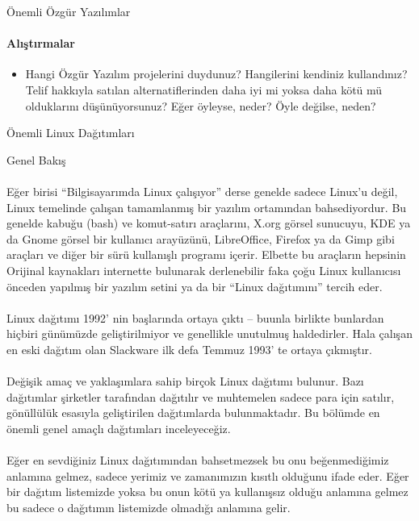 \documentclass[10pt,a5paper]{book}
\begin{document}
\begin{section}{Önemli Özgür Yazılımlar}
\paragraph{Alıştırmalar}
\begin{itemize}
 \item Hangi Özgür Yazılım projelerini duydunuz? Hangilerini kendiniz kullandınız? Telif hakkıyla satılan alternatiflerinden daha iyi mi yoksa daha kötü mü olduklarını düşünüyorsunuz? Eğer öyleyse, neder? Öyle değilse, neden?
\end{itemize}
\end{section}
\begin{section}{Önemli Linux Dağıtımları}
\begin{subsection}{Genel Bakış}
\paragraph{}{Eğer birisi “Bilgisayarımda Linux çalışıyor” derse genelde sadece Linux'u değil, Linux temelinde çalışan tamamlanmış bir yazılım ortamından bahsediyordur. Bu genelde kabuğu (bash) ve komut-satırı araçlarını, X.org görsel sunucuyu, KDE ya da Gnome görsel bir kullanıcı arayüzünü, LibreOffice, Firefox ya da Gimp gibi araçları ve diğer bir sürü kullanışlı programı içerir. Elbette bu araçların hepsinin Orijinal kaynakları internette bulunarak derlenebilir faka çoğu Linux kullanıcısı önceden yapılmış bir yazılım setini ya da bir “Linux dağıtımını” tercih eder.}
\paragraph{} {Linux dağıtımı 1992' nin başlarında ortaya çıktı -- buunla birlikte bunlardan hiçbiri günümüzde geliştirilmiyor ve genellikle unutulmuş haldedirler. Hala çalışan en eski dağıtım olan Slackware ilk defa Temmuz 1993' te ortaya çıkmıştır.}
\paragraph{}{Değişik amaç ve yaklaşımlara sahip birçok Linux dağıtımı bulunur. Bazı dağıtımlar şirketler tarafından dağıtılır ve muhtemelen sadece para için satılır, gönüllülük esasıyla geliştirilen dağıtımlarda bulunmaktadır. Bu bölümde en önemli genel amaçlı dağıtımları inceleyeceğiz.}
\paragraph{}{Eğer en sevdiğiniz Linux dağıtımından bahsetmezsek bu onu beğenmediğimiz anlamına gelmez, sadece yerimiz ve zamanımızın kısıtlı olduğunu ifade eder. Eğer bir dağıtım listemizde yoksa bu onun kötü ya kullanışsız olduğu anlamına gelmez bu sadece o dağıtımın listemizde olmadığı anlamına gelir.}

\end{subsection}
\end{section}
\end{document}

